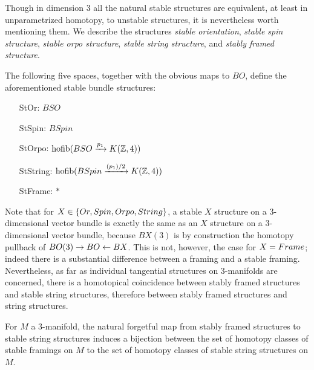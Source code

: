 \documentclass{amsart}
\begin{document}


Though in dimension 3 all the natural stable structures are equivalent, at least in unparametrized homotopy, to unstable structures, it is nevertheless worth mentioning them.  We describe the structures \emph{stable orientation}, \emph{stable spin structure}, \emph{stable orpo structure}, \emph{stable string structure}, and \emph{stably framed structure}.

\begin{definition}
The following five spaces, together with the obvious maps to $BO$, define the aforementioned stable bundle structures:
\begin{itemize}
\item[StOr:] $BSO$
\item[StSpin:] $BSpin$
\item[StOrpo:] $\operatorname{hofib}(BSO \xrightarrow{p_1} K(\mathbb Z,4))$
\item[StString:] $\operatorname{hofib}(BSpin \xrightarrow{(p_1)/2} K(\mathbb Z,4))$
\item[StFrame:] $*$
\end{itemize}
\end{definition}

\nid Note that for $X \in \{Or, Spin, Orpo, String\}$, a stable $X$ structure on a 3-dimensional vector bundle is exactly the same as an $X$ structure on a 3-dimensional vector bundle, because $BX(3)$ is by construction the homotopy pullback of $BO(3) \rightarrow BO \leftarrow BX$.  This is not, however, the case for $X = Frame$; indeed there is a substantial difference between a framing and a stable framing.  Nevertheless, as far as individual tangential structures on 3-manifolds are concerned, there is a homotopical coincidence between stably framed structures and stable string structures, therefore between stably framed structures and string structures.
\begin{proposition}
For $M$ a 3-manifold, the natural forgetful map from stably framed structures to stable string structures induces a bijection between the set of homotopy classes of stable framings on $M$ to the set of homotopy classes of stable string structures on $M$.
\end{proposition}
\end{document}
